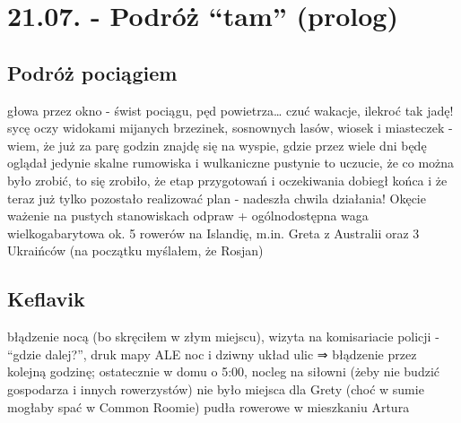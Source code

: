 \chapter*{21.07. - Podróż “tam” (prolog)}


\section*{Podróż pociągiem}

głowa przez okno - świst pociągu, pęd powietrza… czuć wakacje, ilekroć tak jadę!
sycę oczy widokami mijanych brzezinek, sosnownych lasów, wiosek i miasteczek - wiem, że już za parę godzin znajdę się na wyspie, gdzie przez wiele dni będę oglądał jedynie skalne rumowiska i wulkaniczne pustynie
to uczucie, że co można było zrobić, to się zrobiło, że etap przygotowań i oczekiwania dobiegł końca i że teraz już tylko pozostało realizować plan - nadeszła chwila działania!
Okęcie
ważenie na pustych stanowiskach odpraw + ogólnodostępna waga wielkogabarytowa
ok. 5 rowerów na Islandię, m.in. Greta z Australii oraz 3 Ukraińców (na początku myślałem, że Rosjan)

\section*{Keflavik}

błądzenie nocą (bo skręciłem w złym miejscu), wizyta na komisariacie policji - “gdzie dalej?”, druk mapy ALE noc i dziwny układ ulic ⇒ błądzenie przez kolejną godzinę; ostatecznie w domu o 5:00, nocleg na siłowni (żeby nie budzić gospodarza i innych rowerzystów)
nie było miejsca dla Grety (choć w sumie mogłaby spać w Common Roomie)
pudła rowerowe w mieszkaniu Artura

